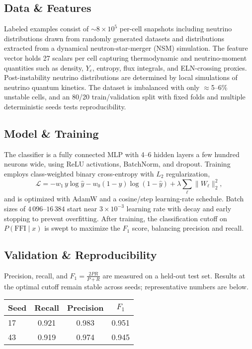 \documentclass[10pt]{article}
\begin{document}
\begin{center}
\subsection*{Data \& Features}
Labeled examples consist of $\sim 8\times 10^5$ per-cell snapshots including neutrino distributions drawn from randomly generated datasets and distributions extracted from a dynamical neutron-star-merger (NSM) simulation.
The feature vector holds 27 scalars per cell capturing thermodynamic and neutrino-moment quantities such as density, $Y_e$, entropy, flux integrals, and ELN-crossing proxies.
Post-instability neutrino distributions are determined by local simulations of neutrino quantum kinetics.
The dataset is imbalanced with only $\approx$5--6\% unstable cells, and an 80/20 train/validation split with fixed folds and multiple deterministic seeds tests reproducibility.

\subsection*{Model \& Training}
The classifier is a fully connected MLP with 4--6 hidden layers a few hundred neurons wide, using ReLU activations, BatchNorm, and dropout.
Training employs class-weighted binary cross-entropy with $L_2$ regularization,
\begin{equation*}
\mathcal{L} = -w_1\, y\log \hat y - w_0 (1-y)\log(1-\hat y) + \lambda \sum_{\ell}\lVert W_\ell\rVert_2^2,
\end{equation*}
and is optimized with AdamW and a cosine/step learning-rate schedule.
Batch sizes of $4\,096$--$16\,384$ start near $3\times 10^{-3}$ learning rate with decay and early stopping to prevent overfitting.
After training, the classification cutoff on $P(\mathrm{FFI}\mid x)$ is swept to maximize the $F_1$ score, balancing precision and recall.

\subsection*{Validation \& Reproducibility}
Precision, recall, and $F_1 = \frac{2PR}{P+R}$ are measured on a held-out test set.
Results at the optimal cutoff remain stable across seeds; representative numbers are below.

\begin{center}
\begin{tabular}{@{}lccc@{}}
\toprule
Seed & Recall & Precision & $F_1$ \\\midrule
17 & 0.921 & 0.983 & 0.951 \\
43 & 0.919 & 0.974 & 0.945 \\
\bottomrule
\end{tabular}
\end{center}


\end{center}
\end{document}
